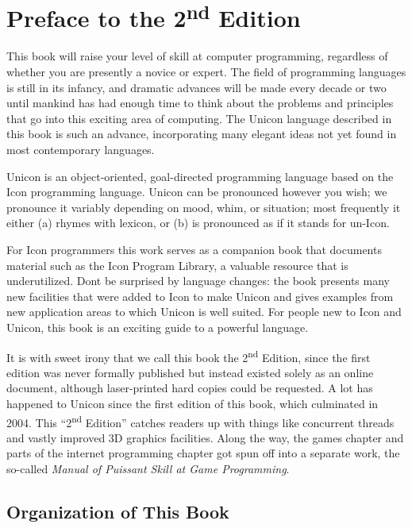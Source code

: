 \section[Preface to the 2nd Edition]{Preface to the
2\textsuperscript{nd} Edition}

This book will raise your level of skill at computer programming,
regardless of whether you are presently a novice or expert. The field
of programming languages is still in its infancy, and dramatic advances
will be made every decade or two until mankind has had enough time to
think about the problems and principles that go into this exciting area
of computing. The Unicon language described in this book is such an
advance, incorporating many elegant ideas not yet found in most
contemporary languages.

Unicon is an object-oriented, goal-directed programming language based
on the Icon programming language. Unicon can be pronounced however you
wish; we pronounce it variably depending on mood, whim, or situation;
most frequently it either (a) rhymes with
{\textquotedbl}lexicon{\textquotedbl}, or (b) is pronounced as if it
stands for {\textquotedbl}un-Icon{\textquotedbl}.

For Icon programmers this work serves as a {\textquotedbl}companion
book{\textquotedbl} that documents material such as the Icon Program
Library, a valuable resource that is underutilized.
Don{\textquotesingle}t be surprised by language changes: the book
presents many new facilities that were added to Icon to make Unicon and
gives examples from new application areas to which Unicon is well
suited. For people new to Icon and Unicon, this book is an exciting
guide to a powerful language.

It is with sweet irony that we call this book the 2\textsuperscript{nd}
Edition, since the first edition was never formally published but
instead existed solely as an online document, although laser-printed
hard copies could be requested. A lot has happened to Unicon since the
first edition of this book, which culminated in 2004. This
{\textquotedblleft}2\textsuperscript{nd} Edition{\textquotedblright}
catches readers up with things like concurrent threads and vastly
improved 3D graphics facilities. Along the way, the games chapter and
parts of the internet programming chapter got spun off into a separate
work, the so-called \textit{Manual of Puissant Skill at Game
Programming}. 

\subsection{Organization of This Book}

